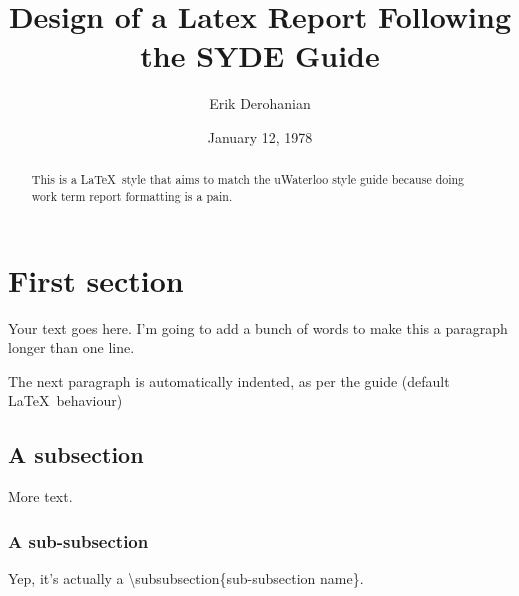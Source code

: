 \documentclass[twoside, 12pt]{article}
\title{Design of a Latex Report Following the SYDE Guide}
\author{Erik Derohanian}
\date{January 12, 1978}
\begin{document}
	
	\makewtrtitle

	\begin{abstract}
		This is a \LaTeX\ style that aims to match the uWaterloo style guide because doing work term report formatting is a pain.
	\end{abstract}

	\tableofcontents
	\newpage

	\listoffigures
	\newpage
	\listoftables
	\newpage

	\startarabicpagenumbers

	\section{First section}

	Your text goes here. I'm going to add a bunch of words to make this a paragraph longer than one line.

	The next paragraph is automatically indented, as per the guide (default \LaTeX\ behaviour)

	\subsection{A subsection}

	More text.

	\subsubsection{A sub-subsection}

	Yep, it's actually a \textbackslash subsubsection\{sub-subsection name\}.
\end{document}
